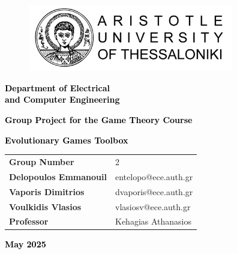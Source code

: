 \documentclass[12pt]{article}
\begin{document}
\begin{titlepage}
\centering
\begin{figure}[H]
\centering
\includegraphics[width=0.8\textwidth]{banner-horizontal-black-en.png}\par %
\end{figure}
\vspace{18pt}
\textcolor{black}{\Large \bfseries Department of Electrical\\ and Computer Engineering\\}\par
\vspace{1cm}
\vfill
\textcolor{black}{\Large \bfseries Group Project for the Game Theory Course}\par
\vspace{12pt}
\textcolor{black}{\large \bfseries Evolutionary Games Toolbox}\par

\vspace{0.5cm} %
\vfill
{}%
%
{\large
\def\arraystretch{1.3}
\begin{tabularx}{\textwidth}{ R|L }
\textbf{Group Number}                			 & 2           \\
\textbf{Delopoulos Emmanouil}      & entelopo@ece.auth.gr \\
\textbf{Vaporis Dimitrios}        & dvaporis@ece.auth.gr \\
\textbf{Voulkidis Vlasios}      & vlasiosv@ece.auth.gr \\
\textbf{Professor}           & Kehagias Athanasios\\
\end{tabularx}
}
\vspace{0.5cm}
\vfill
\textcolor{black}{\large \bfseries May 2025}\par
\end{titlepage}
\restoregeometry

\tableofcontents %


\clearpage
\listoffigures{}
\end{document}
